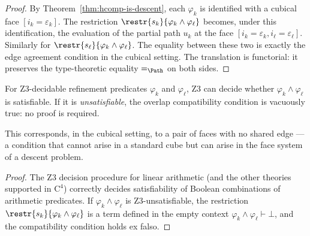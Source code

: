 \begin{proof}
By Theorem~\ref{thm:hcomp-is-descent}, each $\varphi_k$ is identified with
a cubical face $[i_k = \varepsilon_k]$.  The restriction
$\restr{s_k}{\varphi_k \wedge \varphi_\ell}$ becomes, under this
identification, the evaluation of the partial path $u_k$ at the face
$[i_k = \varepsilon_k, i_\ell = \varepsilon_\ell]$.  Similarly for
$\restr{s_\ell}{\varphi_k \wedge \varphi_\ell}$.  The equality between
these two is exactly the edge agreement condition in the cubical setting.
The translation is functorial: it preserves the type-theoretic equality
$=_{\Path}$ on both sides.
\end{proof}

\begin{proposition}
\label{prop:z3-empty-overlap}
For Z3-decidable refinement predicates $\varphi_k$ and $\varphi_\ell$,
Z3 can decide whether $\varphi_k \wedge \varphi_\ell$ is satisfiable.
If it is \emph{unsatisfiable}, the overlap compatibility condition is
vacuously true: no proof is required.

This corresponds, in the cubical setting, to a pair of faces with no
shared edge --- a condition that cannot arise in a standard cube but
can arise in the face system of a descent problem.
\end{proposition}

\begin{proof}
The Z3 decision procedure for linear arithmetic (and the other theories
supported in $\mathrm{C}^4$) correctly decides satisfiability of
Boolean combinations of arithmetic predicates.  If $\varphi_k \wedge
\varphi_\ell$ is Z3-unsatisfiable, the restriction
$\restr{s_k}{\varphi_k \wedge \varphi_\ell}$ is a term defined in the
empty context $\varphi_k \wedge \varphi_\ell \vdash \bot$, and the
compatibility condition holds ex falso.
\end{proof}

